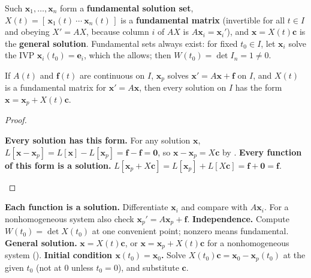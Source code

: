 \documentclass[10pt]{scrartcl}
\newcommand{\vv}[1]{\mathbf{#1}}
\newenvironment{howto}[1]{\begin{mdframed}[style=howtostyle,frametitle={#1}]}{\end{mdframed}}
\begin{document}
Such $\vv x_1,\dots,\vv x_n$ form a \textbf{fundamental solution set}, $X(t)=[\,\vv x_1(t)\ \cdots\ \vv x_n(t)\,]$ is a \textbf{fundamental matrix} (invertible for all $t\in I$ and obeying $X'=AX$, because column $i$ of $AX$ is $A\vv x_i=\vv x_i'$), and $\vv x=X(t)\vv c$ is the \textbf{general solution}. Fundamental sets always exist: for fixed $t_0\in I$, let $\vv x_i$ solve the IVP $\vv x_i(t_0)=\vv e_i$, which the  allows; then $W(t_0)=\det I_n=1\neq 0$.

\begin{theorem*}
  If $A(t)$ and $\vv f(t)$ are continuous on $I$, $\vv x_p$ solves $\vv x'=A\vv x+\vv f$ on $I$, and $X(t)$ is a fundamental matrix for $\vv x'=A\vv x$, then every solution on $I$ has the form $\vv x=\vv x_p+X(t)\vv c$.
\end{theorem*}
\begin{proof}
  \begin{steps}
    \ii \textbf{Every solution has this form.} For any solution $\vv x$, $L[\vv x-\vv x_p]=L[\vv x]-L[\vv x_p]=\vv f-\vv f=\vv 0$, so $\vv x-\vv x_p=X\vv c$ by .
    \ii \textbf{Every function of this form is a solution.} $L[\vv x_p+X\vv c]=L[\vv x_p]+L[X\vv c]=\vv f+\vv 0=\vv f$. \qedhere
  \end{steps}
\end{proof}

\begin{howto}{How to check a fundamental set and solve an IVP with it}
  \begin{steps}
    \ii \textbf{Each function is a solution.} Differentiate $\vv x_i$ and compare with $A\vv x_i$. For a nonhomogeneous system also check $\vv x_p'=A\vv x_p+\vv f$.
    \ii \textbf{Independence.} Compute $W(t_0)=\det X(t_0)$ at one convenient point; nonzero means fundamental.
    \ii \textbf{General solution.} $\vv x=X(t)\vv c$, or $\vv x=\vv x_p+X(t)\vv c$ for a nonhomogeneous system ().
    \ii \textbf{Initial condition $\vv x(t_0)=\vv x_0$.} Solve $X(t_0)\vv c=\vv x_0-\vv x_p(t_0)$ at the given $t_0$ (not at $0$ unless $t_0=0$), and substitute $\vv c$.
  \end{steps}
\end{howto}
\end{document}
